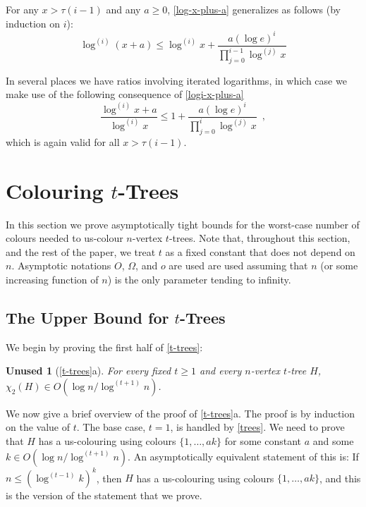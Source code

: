 \documentclass[kpfonts]{patmorin}
\newcommand{\uqs}{\chi_2}
\theoremstyle{named}
\newtheorem*{namedtheorem}{Unused}
\newcommand{\weirdref}[2]{\cref{#1}#2}
\newcommand{\weirdlabel}[2]{\label{#1-#1}}
\begin{document}
For any $x > \tau(i-1)$ and any $a\ge 0$, \cref{log-x-plus-a} generalizes as follows (by induction on $i$):
\begin{equation}
    \log^{(i)}(x+a) \le \log^{(i)} x + \frac{a(\log e)^i}{\prod_{j=0}^{i-1}\log^{(j)} x} \label{logi-x-plus-a}
\end{equation}

In several places we have ratios involving iterated logarithms, in which case we make use of the following consequence of \cref{logi-x-plus-a}
\begin{equation}
    \frac{\log^{(i)} x+a}{\log^{(i)} x} \le 1 + \frac{a(\log e)^i}{\prod_{j=0}^{i}\log^{(j)} x} \enspace, \label{logi-ratio}
\end{equation}
which is again valid for all $x> \tau(i-1)$.

\section{Colouring $t$-Trees}

In this section we prove asymptotically tight bounds for the worst-case number of colours needed to us-colour $n$-vertex $t$-trees.  Note that, throughout this section, and the rest of the paper, we treat $t$ as a fixed constant that does not depend on $n$.  Asymptotic notations $O$, $\Omega$, and $o$ are used are used assuming that $n$ (or some increasing function of $n$) is the only parameter tending to infinity.

\subsection{The Upper Bound for $t$-Trees}

We begin by proving the first half of \cref{t-trees}:

\begin{namedtheorem}[\weirdref{t-trees}{a}]\weirdlabel{t-trees}{a}
    For every fixed $t\ge 1$ and every $n$-vertex $t$-tree $H$, $\uqs(H)\in O(\log n/\log^{(t+1)} n)$.
\end{namedtheorem}

We now give a brief overview of the proof of \weirdref{t-trees}{a}.  The proof is by induction on the value of $t$.  The base case, $t=1$, is handled by \cref{trees}.  We need to prove that $H$ has a us-colouring using colours $\{1,\ldots,ak\}$ for some constant $a$ and some $k\in O(\log n/\log^{(t+1)} n)$.  An asymptotically equivalent statement of this is: If $n \le (\log^{(t-1)}k)^k$, then $H$ has a us-colouring using colours $\{1,\ldots,ak\}$, and this is the version of the statement that we prove.
\end{document}
